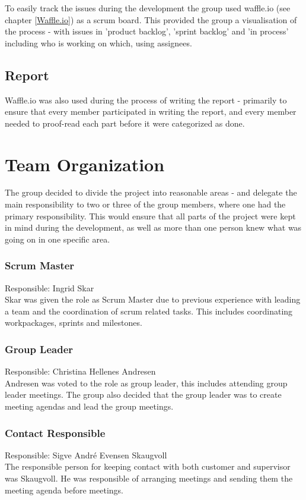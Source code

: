 To easily track the issues during the development the group used waffle.io (see chapter  \ref{Waffle.io}) as a scrum board. This provided the group a visualisation of the process - with issues in 'product backlog', 'sprint backlog' and 'in process' including who is working on which, using assignees. 

\subsection{Report}
Waffle.io was also used during the process of writing the report - primarily to ensure that every member participated in writing the report, and every member needed to proof-read each part before it were categorized as done.

\section{Team Organization}\label{projectOrganisation}
The group decided to divide the project into reasonable areas - and delegate the main responsibility to two or three of the group members, where one had the primary responsibility. This would ensure that all parts of the project were kept in mind during the development, as well as more than one person knew what was going on in one specific area.

\subsubsection{Scrum Master}
Responsible: Ingrid Skar \\
Skar was given the role as Scrum Master due to previous experience with leading a team and the coordination of scrum related tasks. This includes coordinating workpackages, sprints and milestones.

\subsubsection{Group Leader}
Responsible: Christina Hellenes Andresen \\
Andresen was voted to the role as group leader, this includes attending group leader meetings. The group also decided that the group leader was to create meeting agendas and lead the group meetings. 

\subsubsection{Contact Responsible}
Responsible: Sigve André Evensen Skaugvoll \\
The responsible person for keeping contact with both customer and supervisor was Skaugvoll. He was responsible of arranging meetings and sending them the meeting agenda before meetings.

